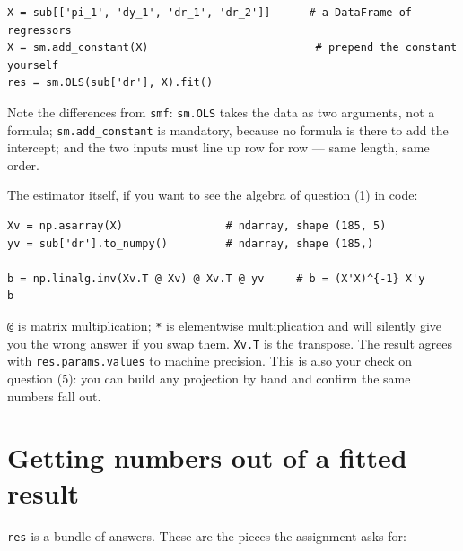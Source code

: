 \documentclass[11pt]{article}
\newcommand{\code}[1]{\texttt{#1}}
\begin{document}
\begin{lstlisting}
X = sub[['pi_1', 'dy_1', 'dr_1', 'dr_2']]      # a DataFrame of regressors
X = sm.add_constant(X)                          # prepend the constant yourself
res = sm.OLS(sub['dr'], X).fit()
\end{lstlisting}

\noindent Note the differences from \code{smf}: \code{sm.OLS} takes the data as
two arguments, not a formula; \code{sm.add\_constant} is mandatory, because no
formula is there to add the intercept; and the two inputs must line up row for
row --- same length, same order.

\noindent The estimator itself, if you want to see the algebra of question (1)
in code:

\begin{lstlisting}
Xv = np.asarray(X)                # ndarray, shape (185, 5)
yv = sub['dr'].to_numpy()         # ndarray, shape (185,)

b = np.linalg.inv(Xv.T @ Xv) @ Xv.T @ yv     # b = (X'X)^{-1} X'y
b
\end{lstlisting}

\noindent\code{@} is matrix multiplication; \code{*} is elementwise
multiplication and will silently give you the wrong answer if you swap them.
\code{Xv.T} is the transpose. The result agrees with \code{res.params.values}
to machine precision. This is also your check on question (5): you can build any
projection by hand and confirm the same numbers fall out.

\section{Getting numbers out of a fitted result}

\code{res} is a bundle of answers. These are the pieces the assignment asks for:
\end{document}
